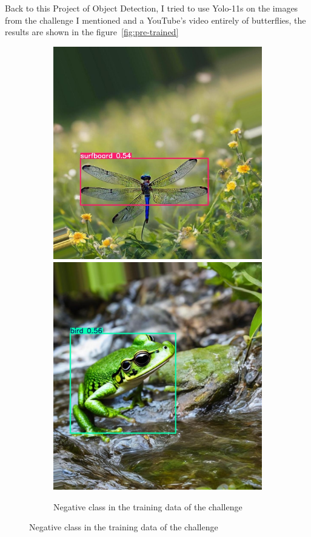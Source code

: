 \documentclass{cpsc202}
\begin{document}
    Back to this Project of Object Detection, I tried to use Yolo-11s on the images from the challenge I mentioned and a YouTube's video entirely of butterflies,
    the results are shown in the figure~\ref{fig:pre-trained}
    \begin{figure}
        \begin{subfigure}{.9\textwidth}
            \centering
            \includegraphics[width=.4\linewidth]{pretrained/negative_imagen_723}
            \includegraphics[width=.4\linewidth]{pretrained/negative_imagen_880}
            \caption{Negative class in the training data of the challenge}
            \label{fig:negative-pretrained}
        \end{subfigure}


\end{figure}
\end{document}
